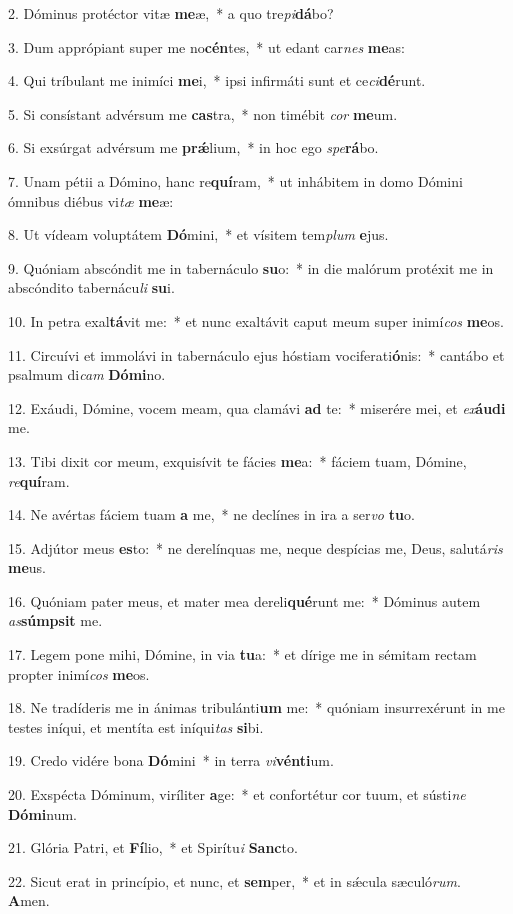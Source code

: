 2. Dóminus protéctor vitæ \textbf{me}æ,~*  a quo tre\textit{pi}\textbf{dá}bo?\

3. Dum apprópiant super me no\textbf{cén}tes,~*  ut edant car\textit{nes} \textbf{me}as:\

4. Qui tríbulant me inimíci \textbf{me}i,~*  ipsi infirmáti sunt et ce\textit{ci}\textbf{dé}runt.\

5. Si consístant advérsum me \textbf{cas}tra,~*  non timébit \textit{cor} \textbf{me}um.\

6. Si exsúrgat advérsum me \textbf{prǽ}lium,~*  in hoc ego \textit{spe}\textbf{rá}bo.\

7. Unam pétii a Dómino, hanc re\textbf{quí}ram,~*  ut inhábitem in domo Dómini ómnibus diébus vi\textit{tæ} \textbf{me}æ:\

8. Ut vídeam voluptátem \textbf{Dó}mini,~*  et vísitem tem\textit{plum} \textbf{e}jus.\

9. Quóniam abscóndit me in tabernáculo \textbf{su}o:~*  in die malórum protéxit me in abscóndito tabernácu\textit{li} \textbf{su}i.\

10. In petra exal\textbf{tá}vit me:~*  et nunc exaltávit caput meum super inimí\textit{cos} \textbf{me}os.\

11. Circuívi et immolávi in tabernáculo ejus hóstiam vociferati\textbf{ó}nis:~*  cantábo et psalmum di\textit{cam} \textbf{Dó}\textbf{mi}no.\

12. Exáudi, Dómine, vocem meam, qua clamávi \textbf{ad} te:~*  miserére mei, et \textit{ex}\textbf{áu}\textbf{di} me.\

13. Tibi dixit cor meum, exquisívit te fácies \textbf{me}a:~*  fáciem tuam, Dómine, \textit{re}\textbf{quí}ram.\

14. Ne avértas fáciem tuam \textbf{a} me,~*  ne declínes in ira a ser\textit{vo} \textbf{tu}o.\

15. Adjútor meus \textbf{es}to:~*  ne derelínquas me, neque despícias me, Deus, salutá\textit{ris} \textbf{me}us.\

16. Quóniam pater meus, et mater mea dereli\textbf{qué}runt me:~*  Dóminus autem \textit{as}\textbf{súmp}\textbf{sit} me.\

17. Legem pone mihi, Dómine, in via \textbf{tu}a:~*  et dírige me in sémitam rectam propter inimí\textit{cos} \textbf{me}os.\

18. Ne tradíderis me in ánimas tribulánti\textbf{um} me:~*  quóniam insurrexérunt in me testes iníqui, et mentíta est iníqui\textit{tas} \textbf{si}bi.\

19. Credo vidére bona \textbf{Dó}mini~*  in terra \textit{vi}\textbf{vén}\textbf{ti}um.\

20. Exspécta Dóminum, viríliter \textbf{a}ge:~*  et confortétur cor tuum, et sústi\textit{ne} \textbf{Dó}\textbf{mi}num.\

21. Glória Patri, et \textbf{Fí}lio,~*  et Spirítu\textit{i} \textbf{Sanc}to.\

22. Sicut erat in princípio, et nunc, et \textbf{sem}per,~*  et in sǽcula sæculó\textit{rum}. \textbf{A}men.\

